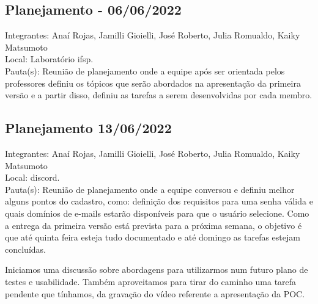 \subsection{Planejamento - 06/06/2022}
\noindent Integrantes: Anaí Rojas, Jamilli Gioielli, José Roberto, Julia Romualdo, Kaiky Matsumoto \\
Local: Laboratório \acs{ifsp}. \\
Pauta(s): Reunião de planejamento onde a equipe após ser orientada pelos professores definiu os tópicos que serão abordados na apresentação da primeira versão e a partir disso, definiu as tarefas a serem desenvolvidas por cada membro.

\subsection{Planejamento 13/06/2022}
\noindent Integrantes: Anaí Rojas, Jamilli Gioielli, José Roberto, Julia Romualdo, Kaiky Matsumoto \\
Local: \gls{discord}. \\
Pauta(s): Reunião de planejamento onde a equipe conversou e definiu melhor alguns pontos do cadastro, como: definição dos requisitos para uma senha válida e quais domínios de e-mails estarão disponíveis para que o usuário selecione. Como a entrega da primeira versão está prevista para a próxima semana, o objetivo é que até quinta feira esteja tudo documentado e até domingo as tarefas estejam concluídas. 

\noindent Iniciamos uma discussão sobre abordagens para utilizarmos num futuro plano de testes e usabilidade. Também aproveitamos para tirar do caminho uma tarefa pendente que tínhamos, da gravação do vídeo referente a apresentação da \acs{POC}.

